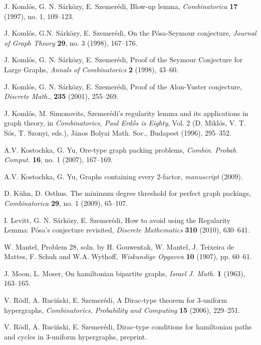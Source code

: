 \documentclass[oneside,12pt]{memoir}
\begin{document}
\begin{thebibliography}{99}
  J. Koml\'{o}s, G. N. S\'{a}rk\"{o}zy, E. Szemer\'{e}di, Blow-up
lemma, \emph{Combinatorica} \textbf{17} (1997), no. 1, 109--123.

J. Koml\'{o}s, G.N. S\'{a}rk\"{o}zy, E. Szemer\'{e}di, On the P\'osa-Seymour
conjecture, \emph{Journal of Graph Theory} \textbf{29}, no. 3 (1998), 167--176.

 J. Koml\'{o}s, G. N. S\'{a}rk\"{o}zy, E. Szemer\'{e}di, Proof of the Seymour Conjecture for Large Graphs, \emph{Annals of Combinatorics} \textbf{2} (1998), 43--60.

  J. Koml\'{o}s, G. N. S\'{a}rk\"{o}zy,  E. Szemer\'edi, Proof of the Alon-Yuster conjecture, \emph{Discrete Math.}, \textbf{235} (2001), 255--269.

  J. Koml\'{o}s, M. Simonovits, Szemer\'{e}di's regularity
lemma and its applications in graph theory, in \emph{Combinatorics, Paul Erd\H{o}s is Eighty}, Vol. 2 (D. Mikl\'{o}s, V. T. S\'{o}s, T. Szonyi, eds.),
J\'{a}nos Bolyai Math. Soc., Budapest (1996), 295--352.

 A.V. Kostochka, G. Yu, Ore-type graph packing problems, \emph{Combin. Probab. Comput.} \textbf{16}, no. 1 (2007), 167--169.

 A.V. Kostochka, G. Yu, Graphs containing every 2-factor, \emph{manuscript} (2009).

D. K\"{u}hn, D. Osthus. The minimum degree threshold for perfect graph packings, \emph{Combinatorica} \textbf{29}, no. 1 (2009), 65--107.

 I. Levitt, G. N. S\'{a}rk\"{o}zy, E. Szemer\'{e}di, How to avoid
using the Regularity Lemma: P\'osa's conjecture revisited, \emph{Discrete
Mathematics} \textbf{310} (2010), 630--641. 

 W. Mantel, Problem 28, soln. by H. Gouwentak, W. Mantel, J. Teixeira de Mattes, F. Schuh and W.A. Wythoff, \emph{Wiskundige Opgaven} \textbf{10} (1907), pp. 60--61.

 J. Moon, L. Moser, On hamiltonian bipartite graphs, \emph{Israel J. Math.} \textbf{1} (1963), 163--165.


V. R\"{o}dl, A. Ruci\'{n}ski, E. Szemer\'{e}di, A Dirac-type
theorem for 3-uniform hypergraphs, \emph{Combinatorics, Probability and
Computing} \textbf{15} (2006), 229--251.

V. R\"{o}dl, A. Ruci\'{n}ski, E. Szemer\'{e}di, Dirac-type
conditions for hamiltonian paths and cycles in 3-uniform hypergraphs,
preprint.


\end{thebibliography}
\end{document}

